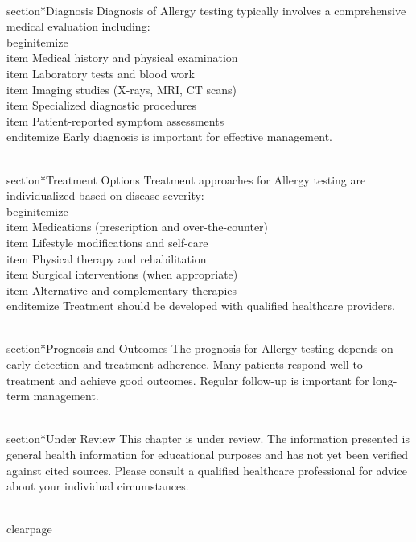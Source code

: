 \\section*{Diagnosis}
Diagnosis of Allergy testing typically involves a comprehensive medical evaluation including:
\\begin{itemize}
  \\item Medical history and physical examination
  \\item Laboratory tests and blood work
  \\item Imaging studies (X-rays, MRI, CT scans)
  \\item Specialized diagnostic procedures
  \\item Patient-reported symptom assessments
\\end{itemize}
Early diagnosis is important for effective management.

\\section*{Treatment Options}
Treatment approaches for Allergy testing are individualized based on disease severity:
\\begin{itemize}
  \\item Medications (prescription and over-the-counter)
  \\item Lifestyle modifications and self-care
  \\item Physical therapy and rehabilitation
  \\item Surgical interventions (when appropriate)
  \\item Alternative and complementary therapies
\\end{itemize}
Treatment should be developed with qualified healthcare providers.

\\section*{Prognosis and Outcomes}
The prognosis for Allergy testing depends on early detection and treatment adherence. Many patients respond well to treatment and achieve good outcomes. Regular follow-up is important for long-term management.

\\section*{Under Review}
This chapter is under review. The information presented is general health information for educational purposes and has not yet been verified against cited sources. Please consult a qualified healthcare professional for advice about your individual circumstances.

\\clearpage
